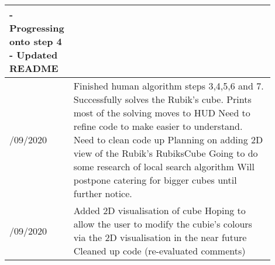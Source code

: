 \documentclass[10pt]{article} %
\begin{document}
\begin{table}[!ht]
\begin{tabular}{
        |>{\centering\arraybackslash}p{0.1\linewidth}
        |p{0.8\linewidth}|}
    - Progressing onto step 4   \newline
    - Updated README
    \\ \hline
    17/09/2020  &
    Finished human algorithm steps 3,4,5,6 and 7.   \newline
    Successfully solves the Rubik's cube.   \newline
    Prints most of the solving moves to HUD \newline
    Need to refine code to make easier to understand.   \newline
    Need to clean code up   \newline
    Planning on adding 2D view of the Rubik's RubiksCube    \newline
    Going to do some research of local search algorithm \newline
    Will postpone catering for bigger cubes until further notice.   \newline
    \\ \hline
    19/09/2020  &
    Added 2D visualisation of cube \newline
    Hoping to allow the user to modify the cubie's colours via the 2D visualisation in the near future
    Cleaned up code (re-evaluated comments)
    \\ \hline
    \end{tabular}
\end{table}
\end{document}
